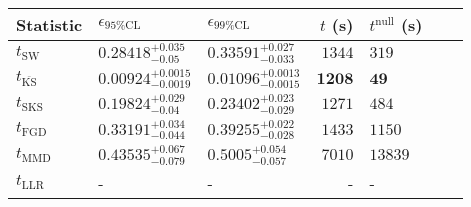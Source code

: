 \begin{tabular}{l|llr|llr}
	Statistic & $\epsilon_{95\%\mathrm{CL}}$ & $\epsilon_{99\%\mathrm{CL}}$ & $t$ (s) & $t^{\mathrm{null}}$ (s) \\
	\midrule
	$t_{\mathrm{SW}}$ & $0.28418_{-0.05}^{+0.035}$ & $0.33591_{-0.033}^{+0.027}$ & $1344$ & $319$ \\
	$t_{\overline{\mathrm{KS}}}$ & ${\mathbf{0.00924_{-0.0019}^{+0.0015}}}$ & ${\mathbf{0.01096_{-0.0015}^{+0.0013}}}$ & ${\mathbf{1208}}$ & ${\mathbf{49}}$ \\
	$t_{\mathrm{SKS}}$ & $0.19824_{-0.04}^{+0.029}$ & $0.23402_{-0.029}^{+0.023}$ & $1271$ & $484$ \\
	$t_{\mathrm{FGD}}$ & $0.33191_{-0.044}^{+0.034}$ & $0.39255_{-0.028}^{+0.022}$ & $1433$ & $1150$ \\
	$t_{\mathrm{MMD}}$ & $0.43535_{-0.079}^{+0.067}$ & $0.5005_{-0.057}^{+0.054}$ & $7010$ & $13839$ \\
	$t_{\mathrm{LLR}}$ & - & - & - & - \\
	\bottomrule
\end{tabular}